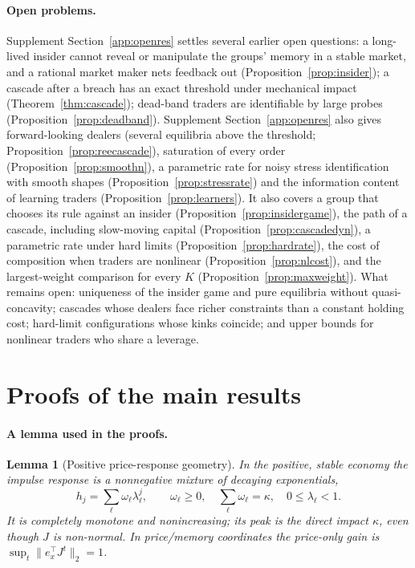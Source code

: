 \documentclass[12pt]{article}
\newtheorem{lemma}[theorem]{Lemma}
\theoremstyle{definition}
\theoremstyle{remark}
\begin{document}
\paragraph{Open problems.} Supplement Section~\ref{app:openres} settles several earlier open questions: a long-lived insider cannot reveal or manipulate the groups' memory in a stable market, and a rational market maker nets feedback out (Proposition~\ref{prop:insider}); a cascade after a breach has an exact threshold under mechanical impact (Theorem~\ref{thm:cascade}); dead-band traders are identifiable by large probes (Proposition~\ref{prop:deadband}). Supplement Section~\ref{app:openres} also gives forward-looking dealers (several equilibria above the threshold; Proposition~\ref{prop:reecascade}), saturation of every order (Proposition~\ref{prop:smoothn}), a parametric rate for noisy stress identification with smooth shapes (Proposition~\ref{prop:stressrate}) and the information content of learning traders (Proposition~\ref{prop:learners}). It also covers a group that chooses its rule against an insider (Proposition~\ref{prop:insidergame}), the path of a cascade, including slow-moving capital (Proposition~\ref{prop:cascadedyn}), a parametric rate under hard limits (Proposition~\ref{prop:hardrate}), the cost of composition when traders are nonlinear (Proposition~\ref{prop:nlcost}), and the largest-weight comparison for every $K$ (Proposition~\ref{prop:maxweight}). What remains open: uniqueness of the insider game and pure equilibria without quasi-concavity; cascades whose dealers face richer constraints than a constant holding cost; hard-limit configurations whose kinks coincide; and upper bounds for nonlinear traders who share a leverage.



\section{Proofs of the main results}\label{app:proofs}

\paragraph{A lemma used in the proofs.}
\begin{lemma}[Positive price-response geometry]\label{lem:cm}
In the positive, stable economy the impulse response is a nonnegative mixture of decaying exponentials,
\[
h_j=\sum_\ell \omega_\ell\lambda_\ell^j,\qquad \omega_\ell\ge0,\quad \sum_\ell\omega_\ell=\kappa,\quad 0\le\lambda_\ell<1 .
\]
It is completely monotone and nonincreasing; its peak is the direct impact $\kappa$, even though $J$ is non-normal. In price/memory coordinates the price-only gain is $\sup_t\|e_x^\top J^t\|_2=1$.
\end{lemma}
\end{document}
